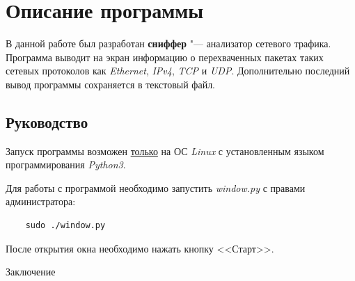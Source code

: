 \documentclass[bachelor, och, coursework]{SCWorks}
\begin{document}
\section{Описание программы}
В данной работе был разработан \textbf{сниффер} "--- анализатор сетевого трафика. Программа выводит на экран информацию о перехваченных пакетах таких сетевых протоколов как \textit{Ethernet}, \textit{IPv4}, \textit{TCP} и \textit{UDP}. Дополнительно последний вывод программы сохраняется в текстовый файл.

\subsection{Руководство}
Запуск программы возможен \underline{только} на ОС \textit{Linux} с установленным языком программирования \textit{Python3}.

Для работы с программой необходимо запустить \textit{window.py} с правами администратора:
\begin{verbatim}
    sudo ./window.py
\end{verbatim}
После открытия окна необходимо нажать кнопку <<Старт>>.







\conclusion
Заключение



\end{document}
